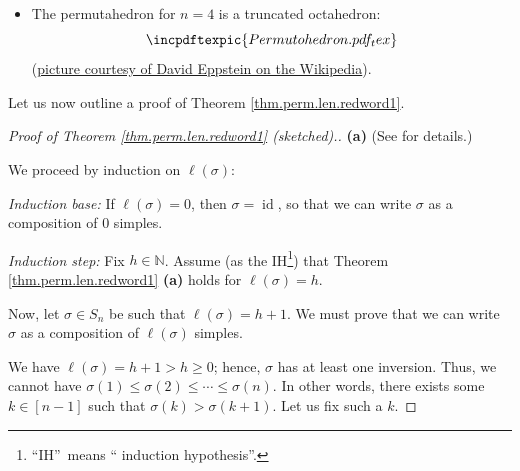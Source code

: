 \begin{remark}
\begin{itemize}
\item The permutahedron for $n=4$ is a truncated octahedron:%
\[%
\incpdftexpic{Permutohedron.pdf_tex}%
\]
(\href{https://en.wikipedia.org/wiki/File:Permutohedron.svg}{picture courtesy
of David Eppstein on the Wikipedia}).
\end{itemize}
\end{remark}

Let us now outline a proof of Theorem \ref{thm.perm.len.redword1}.

\begin{proof}
[Proof of Theorem \ref{thm.perm.len.redword1} (sketched).]\textbf{(a)} (See
\cite[Exercise 5.2 \textbf{(e)}]{detnotes} for details.)

We proceed by induction on $\ell\left(  \sigma\right)  $:

\textit{Induction base:} If $\ell\left(  \sigma\right)  =0$, then
$\sigma=\operatorname*{id}$, so that we can write $\sigma$ as a composition of
$0$ simples.

\textit{Induction step:} Fix $h\in\mathbb{N}$. Assume (as the
IH\footnote{\textquotedblleft IH\textquotedblright\ means \textquotedblleft
induction hypothesis\textquotedblright.}) that Theorem
\ref{thm.perm.len.redword1} \textbf{(a)} holds for $\ell\left(  \sigma\right)
=h$.

Now, let $\sigma\in S_{n}$ be such that $\ell\left(  \sigma\right)  =h+1$. We
must prove that we can write $\sigma$ as a composition of $\ell\left(
\sigma\right)  $ simples.

We have $\ell\left(  \sigma\right)  =h+1>h\geq0$; hence, $\sigma$ has at least
one inversion. Thus, we cannot have $\sigma\left(  1\right)  \leq\sigma\left(
2\right)  \leq\cdots\leq\sigma\left(  n\right)  $. In other words, there
exists some $k\in\left[  n-1\right]  $ such that $\sigma\left(  k\right)
>\sigma\left(  k+1\right)  $. Let us fix such a $k$.


\end{proof}
